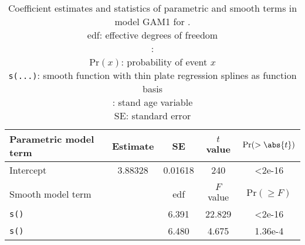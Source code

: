 \begin{singlespace}
  \begin{table}[h]
    \caption{Coefficient estimates and statistics of parametric and smooth terms in model GAM1 for \Spruce{}. \\
      edf: effective degrees of freedom \\
      \texttt{\ProductivityIndexVariableR{}}: \ProductivityIndexVariableText{} \\
      \(\text{Pr}(x)\): probability of event \(x\) \\
      \texttt{s(...)}: smooth function with thin plate regression splines as function basis \\
      \texttt{\StandAgeVariableR{}}: stand age variable \\
      SE: standard error}
    \label{tab:StatisticsGAM1Beech}
    {\tabulinesep=2mm
      \begin{tabu}{L
          S[table-format = 1.5]
          S[table-format = 1.5]
          S[table-format = 3.3]
          S[table-format = 1.2e-2, table-comparator = true]
        }
        \toprule
        Parametric model term & {Estimate} & {SE} & {\(t\) value} & {\(\text{Pr}(> \abs{t})\)} \\
        \midrule
        Intercept & 3.88328 & 0.01618 & 240 & <2e-16 \\
        \\
        Smooth model term &  & {edf} & {\(F\) value} & {\(\text{Pr}(\geq F)\)} \\
        \midrule
        \texttt{s(\StandAgeVariableR{})} & & 6.391 & 22.829 & <2e-16 \\
        \texttt{s(\ProductivityIndexVariableR{})} & & 6.480 & 4.675 & 1.36e-4 \\
        \bottomrule
      \end{tabu}
    }
  \end{table}
\end{singlespace}

